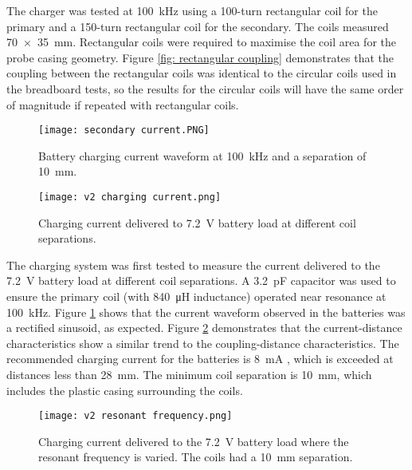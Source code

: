 The charger was tested at \SI{100}{\kilo\hertz} using a 100-turn rectangular coil for the primary and a 150-turn rectangular coil for the secondary. The coils measured \SI{70 x 35}{\milli\metre}. Rectangular coils were required to maximise the coil area for the probe casing geometry. Figure \ref{fig: rectangular coupling} demonstrates that the coupling between the rectangular coils was identical to the circular coils used in the breadboard tests, so the results for the circular coils will have the same order of magnitude if repeated with rectangular coils.\\

\begin{figure}[htb]
	\centering
	\texttt{[image: secondary current.PNG]}
	\caption{Battery charging current waveform at \SI{100}{\kilo\hertz} and a separation of \SI{10}{\milli\metre}.}
	\label{fig: secondary current}
\end{figure}

\begin{figure}[h!]
	\centering
	\texttt{[image: v2 charging current.png]}
	\caption{Charging current delivered to \SI{7.2}{\volt} battery load at different coil separations.}
	\label{fig: current distance}
\end{figure}

The charging system was first tested to measure the current delivered to the \SI{7.2}{\volt} battery load at different coil separations. A \SI{3.2}{\pico\farad} capacitor was used to ensure the primary coil (with \SI{840}{\micro\henry} inductance) operated near resonance at \SI{100}{\kilo\hertz}. Figure \ref{fig: secondary current} shows that the current waveform observed in the batteries was a rectified sinusoid, as expected. Figure \ref{fig: current distance} demonstrates that the current-distance characteristics show a similar trend to the coupling-distance characteristics. The recommended charging current for the batteries is \SI{8}{\milli\ampere} \cite{rs_pro_batteries}, which is exceeded at distances less than \SI{28}{\milli\metre}. The minimum coil separation is \SI{10}{\milli\metre}, which includes the plastic casing surrounding the coils.\\

\begin{figure}[h!]
	\centering
	\texttt{[image: v2 resonant frequency.png]}
	\caption{Charging current delivered to the \SI{7.2}{\volt} battery load where the resonant frequency is varied. The coils had a \SI{10}{\milli\metre} separation.}
	\label{fig: current resonance}
\end{figure}


